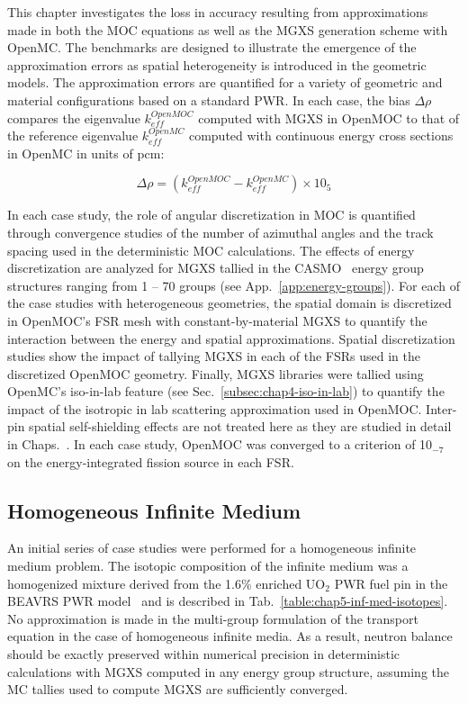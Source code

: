 This chapter investigates the loss in accuracy resulting from approximations made in both the \ac{MOC} equations as well as the \ac{MGXS} generation scheme with OpenMC. The benchmarks are designed to illustrate the emergence of the approximation errors as spatial heterogeneity is introduced in the geometric models. The approximation errors are quantified for a variety of geometric and material configurations based on a standard \ac{PWR}. In each case, the bias $\Delta\rho$ compares the eigenvalue $k_{eff}^{OpenMOC}$ computed with \ac{MGXS} in OpenMOC to that of the reference eigenvalue $k_{eff}^{OpenMC}$ computed with continuous energy cross sections in OpenMC in units of \ac{pcm}:

\begin{equation}
\label{eqn:chap5-delta-rho}
\Delta\rho = \left(k_{eff}^{OpenMOC} - k_{eff}^{OpenMC}\right) \times 10_{5}
\end{equation}

In each case study, the role of angular discretization in \ac{MOC} is quantified through convergence studies of the number of azimuthal angles and the track spacing used in the deterministic \ac{MOC} calculations. The effects of energy discretization are analyzed for \ac{MGXS} tallied in the CASMO~\cite{rhodes2006casmo} energy group structures ranging from 1 -- 70 groups (see App.~\ref{app:energy-groups}). For each of the case studies with heterogeneous geometries, the spatial domain is discretized in OpenMOC's \ac{FSR} mesh with constant-by-material \ac{MGXS} to quantify the interaction between the energy and spatial approximations. Spatial discretization studies show the impact of tallying \ac{MGXS} in each of the \ac{FSR}s used in the discretized OpenMOC geometry. Finally, \ac{MGXS} libraries were tallied using OpenMC's iso-in-lab feature (see Sec.~\ref{subsec:chap4-iso-in-lab}) to quantify the impact of the isotropic in lab scattering approximation used in OpenMOC. Inter-pin spatial self-shielding effects are not treated here as they are studied in detail in Chaps.~. In each case study, OpenMOC was converged to a criterion of 10$_{-7}$ on the energy-integrated fission source in each \ac{FSR}.

\subsection{Homogeneous Infinite Medium}
\label{subsec:chap5-inf-medium}

An initial series of case studies were performed for a homogeneous infinite medium problem. The isotopic composition of the infinite medium was a homogenized mixture derived from the 1.6\% enriched UO$_2$ \ac{PWR} fuel pin in the \ac{BEAVRS} \ac{PWR} model~\cite{horelik2013beavrs} and is described in Tab.~\ref{table:chap5-inf-med-isotopes}. No approximation is made in the multi-group formulation of the transport equation in the case of homogeneous infinite media. As a result, neutron balance should be exactly preserved within numerical precision in deterministic calculations with \ac{MGXS} computed in any energy group structure, assuming the \ac{MC} tallies used to compute \ac{MGXS} are sufficiently converged.

